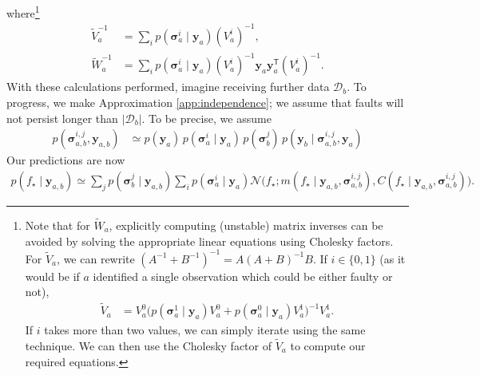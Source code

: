 \documentclass{article} %
\newcommand{\given}{\!\ensuremath{\mid}\!}
\newcommand{\cm}[1]{\ensuremath{\mathcal{#1}}}
\newcommand{\bm}[1]{\ensuremath{\mathbf{#1}}}
\newcommand{\data}{\ensuremath{\cm{D}}}
\newcommand{\vect}[1]{\bm{#1}}
\newcommand{\vy}{\vect{y}}
\newcommand{\vs}{\vect{\sigma}}
\newcommand{\p}[2]{p(#1\given#2)}
\newcommand{\fPr}{p}
\newcommand{\Prob}[2]{\fPr(#1 \given #2 )}
\newcommand{\mean}[2]{{m}(#1\given#2)}
\newcommand{\cov}[2]{{C}(#1\given#2)}
\newcommand{\st}{_{\star}}
\newcommand{\tr}{\ensuremath{\mathsf{T}}}
\newcommand{\defequal}{=}
\DeclareMathOperator{\chol}{chol}
\begin{document}
where\footnote{
Note that for $\tilde{W}_a$, explicitly computing (unstable) matrix
inverses can be avoided by solving the appropriate linear equations
using Cholesky factors.  For $\tilde{V}_a$, we can rewrite
$(A^{-1}+B^{-1})^{-1} = A (A+B)^{-1} B$. If $i\in\{0,1\}$ (as it would
be if $a$ identified a single observation which could be either faulty
or not),
\begin{align} \label{eq:inverse_trick}
\tilde{V}_a & = V^0_a\bigl(
\Prob{\vs^1_{a}}{\vy_a} V^0_a 
+ 
\Prob{\vs^0_{a}}{\vy_a} V^1_a
\bigr)^{-1}V^1_a.
\end{align}
If $i$ takes more than two values, we can simply iterate using the
same technique. We can then use the Cholesky factor of $\tilde{V}_a$ to compute our required equations.}
\begin{align}
 \tilde{V}_a^{-1}  & \defequal \sum_i \Prob{\vs^i_{a}}{\vy_a} (V_a^i)^{-1},\nonumber\\
 \tilde{W}_a^{-1} & \defequal \sum_i \Prob{\vs^i_{a}}{\vy_a} (V_a^i)^{-1}\vy_a \vy_a^\tr (V_a^i)^{-1}.\label{eq:Wa}
\end{align}
With these calculations performed, imagine receiving
further data $\data_b$. To progress, we make Approximation \ref{app:independence}; we assume that faults will not persist longer than $|\data_b|$. To be precise, we assume
\begin{align} \label{eq:approx}
p(\vs^{i,j}_{a,b},\vy_{a,b}) & \simeq p(\vy_a)\,\Prob{\vs^i_{a}}{\vy_a}\,
p(\vs^j_{b})\,\p{\vy_b}{\vs^{i,j}_{a,b},\vy_{a}}
\end{align}
Our predictions are now
\begin{align}
\p{f\st}{\vy_{a,b}} %
\simeq 
\sum_{j} \Prob{\vs^j_{b}}{\vy_{a,b}}\sum_{i} \Prob{\vs^i_{a}}{\vy_a} {}
 \cm{N}\bigl(f\st; \mean{f\st}{\vy_{a,b}, \vs^{i,j}_{a,b}}, \cov{f\st}{\vy_{a,b}, \vs^{i,j}_{a,b}}\bigr).\label{eq:sum_o_Gaussians}
\end{align}
\end{document}
